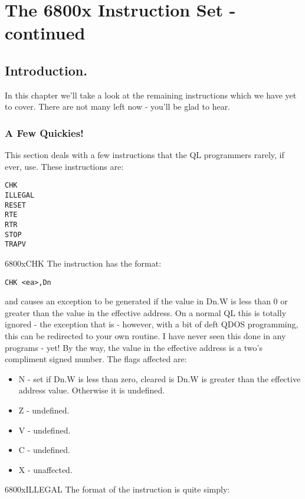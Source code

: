 \chapter{The 6800x Instruction Set -{} continued}

\section{Introduction.}
\label{ch5-intro}%

In this chapter we'll take a look at the remaining instructions
    which we have yet to cover. There are not many left now -{} you'll be glad
    to hear.

\subsection{A Few Quickies!}
\label{ch5-quickies}%

This section deals with a few instructions that the QL programmers
      rarely, if ever, use. These instructions are:

\begin{lstlisting}[firstnumber=1,frame=none,numbers=none]
CHK
ILLEGAL
RESET
RTE
RTR
STOP
TRAPV
\end{lstlisting}
\mc6800x{CHK}
The  instruction has the format:

\begin{lstlisting}[firstnumber=1,]
          CHK <ea>,Dn
\end{lstlisting}

and causes an exception to be generated if the value in Dn.W is
      less than 0 or greater than the value in the effective address. On a
      normal QL this is totally ignored -{} the exception that is -{} however,
      with a bit of deft QDOS programming, this can be redirected to your own
      routine. I have never seen this done in any programs -{} yet! By the way,
      the value in the effective address is a two's compliment signed number.
      The flags affected are:
\begin{itemize}[itemsep=0pt]

\item{}N -{} set if Dn.W is less than zero, cleared is Dn.W is greater
          than the effective address value. Otherwise it is undefined.


\item{}Z -{} undefined.


\item{}V -{} undefined.


\item{}C -{} undefined.


\item{}X -{} unaffected.

\end{itemize}
\mc6800x{ILLEGAL}
The format of the  instruction is quite simply:

